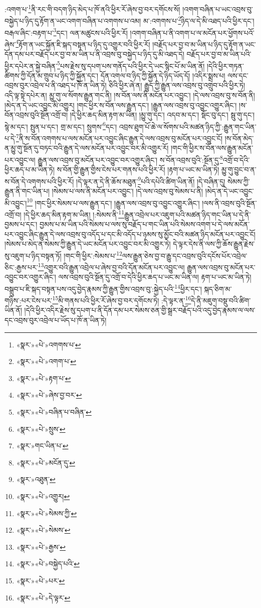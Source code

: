 :འགག་པ་\footnote{«སྣར་»«པེ་»འགགས་པ་}ནི་རང་གི་བདག་ཉིད་མེད་པ་ཁོ་ནའི་ཕྱིར་རོ་ཞེས་བྱ་བར་དགོངས་སོ། །འགག་བཞིན་པ་ཡང་འབྲས་བུ་བསྐྱེད་པ་ཉིད་དུ་རྟོག་ན་ཡང་འགག་བཞིན་པ་འགགས་པ་འམ། མ་:འགགས་པ་\footnote{«སྣར་»«པེ་»འགག་པ་}ཉིད་ལ་དེ་མི་འཐད་པའི་ཕྱིར་དང་། བརྒལ་ཞིང་:བརྟག་པ་\footnote{«སྣར་»«པེ་»རྟག་པ་}དང་། ལན་མཚུངས་པའི་ཕྱིར་རོ། །འགག་བཞིན་པ་ནི་འགག་པ་ལ་མངོན་པར་ཕྱོགས་པའོ་ཞེས་\footnote{«སྣར་»«པེ་»ཞེས་བྱ་བར་}རྟོག་ན་ཡང་སྐྱོན་ཇི་སྐད་བསྟན་པ་ཉིད་དུ་འགྱུར་བའི་ཕྱིར་རོ། །བརྗོད་པར་བྱ་བ་མ་ཡིན་པ་ཉིད་དུ་རྟོག་ན་ཡང་དོན་དམ་པར་བརྗོད་པར་བྱ་བ་མ་ཡིན་པ་ནི་འབྲས་བུ་བསྐྱེད་པ་ཉིད་དུ་མི་འཐད་དེ། བརྗོད་པར་བྱ་བ་མ་ཡིན་པའི་ཕྱིར་དཔེར་ན་སྐྱེ་བཞིན་\footnote{«སྣར་»«པེ་»བཞིན་པ་བཞིན་}པས་རྗེས་སུ་དཔག་པས་གནོད་པའི་ཕྱིར་དེ་ཡང་སྙིང་པོ་མ་ཡིན་ནོ། །དེའི་ཕྱིར་གཏན་ཚིགས་ཀྱི་དོན་མ་གྲུབ་པ་ཉིད་ཀྱི་སྐྱོན་དང་། དོན་འགལ་བ་ཉིད་ཀྱི་སྐྱོན་དེ་ཉིད་ཡོད་དོ། །འདིར་སྨྲས་པ། ལས་དང་འབྲས་བུར་འབྲེལ་པ་ནི་འཐད་པ་ཁོ་ན་ཡིན་ཏེ། ཅིའི་ཕྱིར་ཞེ་ན། རྒྱུད་ཀྱི་རྒྱུན་ལས་འབྲས་བུ་འགྲུབ་པའི་ཕྱིར་ཏེ། འདི་ལྟ་སྟེ་དཔེར་ན། མྱུ་གུ་ལ་སོགས་རྒྱུན་གང་ནི། །ས་བོན་ལས་ནི་མངོན་པར་འབྱུང་། །དེ་ལས་འབྲས་བུ་ས་བོན་ནི། །མེད་ན་དེ་ཡང་འབྱུང་མི་འགྱུར། །གང་ཕྱིར་ས་བོན་ལས་རྒྱུན་དང་། །རྒྱུན་ལས་འབྲས་བུ་འབྱུང་འགྱུར་ཞིང་། །ས་བོན་འབྲས་བུའི་སྔོན་འགྲོ་བ། །དེ་ཕྱིར་ཆད་མིན་རྟག་མ་ཡིན། །མྱུ་གུ་དང་། འདབ་མ་དང་། སྡོང་བུ་དང་། སྦུ་གུ་དང་། སྙེ་མ་དང་། སྤུན་པ་དང་། གྲ་མ་དང་། སྲུགས་\footnote{«སྣར་»«པེ་»སྲུས་}དང་། འབྲས་ཐུག་པོ་ཆེ་ལ་སོགས་པའི་མཚན་ཉིད་ཀྱི་:རྒྱུན་གང་ཡིན་པ་དེ་\footnote{«སྣར་»གང་ཡིན་པ་}ནི་ས་བོན་འགགས་པ་ལས་མངོན་པར་འབྱུང་ཞིང་རྒྱུན་དེ་ལས་འབྲས་བུ་མངོན་པར་འབྱུང་ངོ། །ས་བོན་མེད་ན་མྱུ་གུ་སྔོན་དུ་བཏང་བའི་རྒྱུན་དེ་ལས་མངོན་པར་འབྱུང་བར་མི་འགྱུར་རོ། །གང་གི་ཕྱིར་ས་བོན་ལས་རྒྱུན་མངོན་པར་འབྱུང་ལ། རྒྱུན་ལས་འབྲས་བུ་མངོན་པར་འབྱུང་བར་འགྱུར་ཞིང་། ས་བོན་འབྲས་བུའི་:སྔོན་དུ་\footnote{«སྣར་»«པེ་»མངོན་དུ་}འགྲོ་བ་དེའི་ཕྱིར་ཆད་པ་མ་ཡིན་ཏེ། ས་བོན་གྱི་རྒྱུན་གྱིས་ངེས་པར་གནས་པའི་ཕྱིར་རོ། །རྟག་པ་ཡང་མ་ཡིན་ཏེ། མྱུ་གུ་བྱུང་བ་ན་ས་བོན་དེ་འགགས་པའི་ཕྱིར་རོ། །དེ་ལྟར་ན་དེ་ནི་ཆོས་མཐུན་\footnote{«སྣར་»འཐུན་}པའི་དཔེའི་ཚིག་ཡིན་ནོ། །དེ་བཞིན་དུ། སེམས་ཀྱི་རྒྱུན་ནི་གང་ཡིན་པ། །སེམས་པ་ལས་ནི་མངོན་པར་འབྱུང་། །དེ་ལས་འབྲས་བུ་སེམས་པ་ནི། །མེད་ན་དེ་ཡང་འབྱུང་མི་འབྱུང་།\footnote{«སྣར་»«པེ་»འགྱུར།} །གང་ཕྱིར་སེམས་པ་ལས་རྒྱུན་དང་། །རྒྱུན་ལས་འབྲས་བུ་འབྱུང་འགྱུར་ཞིང་། །ལས་ནི་འབྲས་བུའི་སྔོན་འགྲོ་བ། །དེ་ཕྱིར་ཆད་མིན་རྟག་མ་ཡིན། །:སེམས་ནི་\footnote{«སྣར་»«པེ་»སེམས་ཀྱི་}རྒྱུན་འབྲེལ་པར་འཇུག་པའི་མཚན་ཉིད་གང་ཡིན་པ་དེ་ནི་བྱམས་པ་དང་། བྱམས་པ་མ་ཡིན་པའི་སེམས་པ་ལས་སུ་བརྗོད་པ་གང་ཡིན་པའི་སེམས་འགག་པ་དེ་ལས་མངོན་པར་འབྱུང་ཞིང་རྒྱུན་དེ་ལས་འབྲས་བུ་འདོད་པ་དང་མི་འདོད་པ་ཉམས་སུ་མྱོང་བའི་མཚན་ཉིད་མངོན་པར་འབྱུང་ངོ། །སེམས་པ་མེད་ན་སེམས་ཀྱི་རྒྱུན་དེ་ཡང་མངོན་པར་འབྱུང་བར་མི་འགྱུར་ཏེ། དེ་ལྟར་དེས་ནི་ལས་ཀྱི་ཆོས་རྒྱུན་རྗེས་སུ་འཇུག་པ་ཉིད་བསྟན་ཏོ། །གང་གི་ཕྱིར་:སེམས་པ་\footnote{«སྣར་»«པེ་»སེམས་}ལས་རྒྱུན་ཅེས་བྱ་བ་རྒྱུ་དང་འབྲས་བུའི་དངོས་པོར་འབྲེལ་ཅིང་:རྒྱས་པར་\footnote{«སྣར་»«པེ་»རྒྱས་}འགྱུར་བའི་རྒྱུན་འབྲེལ་པ་ཞེས་བྱ་བའི་དོན་མངོན་པར་འབྱུང་ལ། རྒྱུན་ལས་འབྲས་བུ་མངོན་པར་འབྱུང་བར་འགྱུར་ཞིང་། ལས་འབྲས་བུའི་སྔོན་དུ་འགྲོ་བ་དེའི་ཕྱིར་ཆད་པ་ཡང་མ་ཡིན་ལ། རྟག་པ་ཡང་མ་ཡིན་ཏེ། བསྒྲུབ་པ་ཇི་སྐད་བསྟན་པས་འདུ་བྱེད་རྣམས་ཀྱི་རྒྱུན་གྱིས་འབྲས་བུ་:སྐྱེད་པའི་\footnote{«སྣར་»«པེ་»བསྐྱེད་པའི་}ཕྱིར་དང་། སྐད་ཅིག་མ་གཉིས་:པར་ངེས་པར་\footnote{«སྣར་»«པེ་»པར་}མི་གནས་པའི་ཕྱིར་རོ་ཞེས་བྱ་བར་དགོངས་ཏེ། :དེ་ལྟར་ན་\footnote{«སྣར་»«པེ་»དེ་ལྟར་}དེ་ནི་མཇུག་བསྡུ་བའི་ཚིག་ཡིན་ནོ། །དེའི་ཕྱིར་འདིར་རྗེས་སུ་དཔག་པ་ནི་དོན་དམ་པར་སེམས་ཅན་གྱི་སྒྲར་བརྗོད་པའི་འདུ་བྱེད་རྣམས་ལ་ལས་དང་འབྲས་བུར་འབྲེལ་པ་ཡོད་པ་ཁོ་ན་ཡིན་ཏེ། 